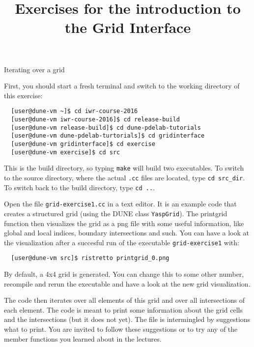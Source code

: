 \documentclass[12pt,a4paper]{article}
\title{\textbf{Exercises for the introduction to the Grid Interface}}
\begin{document}
\exerciseheader

\begin{Exercise}{Iterating over a grid}

First, you should start a fresh terminal and switch to the working directory of this exercise:
\begin{lstlisting}
  [user@dune-vm ~]$ cd iwr-course-2016
  [user@dune-vm iwr-course-2016]$ cd release-build
  [user@dune-vm release-build]$ cd dune-pdelab-tutorials
  [user@dune-vm dune-pdelab-turtorials]$ cd gridinterface
  [user@dune-vm gridinterface]$ cd exercise
  [user@dune-vm exercise]$ cd src
\end{lstlisting}

This is the build directory, so typing \lstinline!make! will build two executables.
To switch to the source directory, where the actual \lstinline!.cc! files are located, type \lstinline!cd src_dir!.
To switch back to the build directory, type \lstinline!cd ..!.

Open the file \texttt{grid-exercise1.cc} in a text editor.  It is an
example code that creates a structured grid (using the DUNE class
\texttt{YaspGrid}). The printgrid function then visualizes the grid
as a png file with some useful information, like global and local
indices, boundary intersections and such. You can have a look at the
visualization after a succesful run of the executable \lstinline!grid-exercise1!
with:

\begin{lstlisting}
  [user@dune-vm src]$ ristretto printgrid_0.png
\end{lstlisting}

By default, a 4x4 grid is generated. You can change this to some
other number, recompile and rerun the executable and have a look at
the new grid visualization.

The code then iterates over all elements of this grid and
over all intersections of each element.  The code is meant to print
some information about the grid cells and the intersections (but it
does not yet).  The file is intermingled by suggestions what to print.
You are invited to follow these suggestions or to try any of the
member functions you learned about in the lectures.

\end{Exercise}
\end{document}
